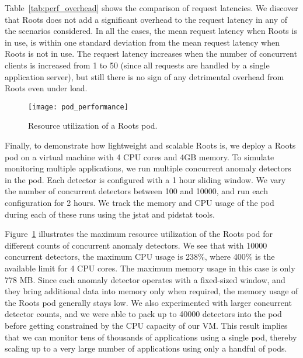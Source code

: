 Table~\ref{tab:perf_overhead} shows the comparison of request 
latencies. We discover that Roots does not add a significant overhead
to the request latency in any of the scenarios considered. In all the cases,
the mean request latency when Roots is in use, is within one standard deviation
from the mean request latency when Roots is not in use. 
The request latency increases when the number of concurrent clients is
increased from 1 to 50 (since all requests are handled by a single
application server), but still there is no sign of any detrimental overhead
from Roots even under load. 

\begin{figure}
\centering
\texttt{[image: pod\_performance]}
\caption{Resource utilization of a Roots pod.}
\label{fig:pod_performance}
\end{figure}

Finally, to demonstrate how lightweight and scalable Roots is, we deploy
a Roots pod on a virtual machine with 4 CPU cores and 4GB memory.
To simulate monitoring multiple applications, we run multiple concurrent anomaly
detectors in the pod. Each detector is configured with a 1 hour sliding window.
We vary the number of concurrent
detectors between 100 and 10000, and run each configuration for
2 hours. We track the memory and CPU usage of the
pod during each of these runs using the jstat and pidstat tools. 

Figure~\ref{fig:pod_performance}
illustrates the maximum resource utilization of the Roots pod for different counts of
concurrent anomaly detectors. We see that with 10000 concurrent
detectors, the maximum CPU usage is 238\%, where 400\% is the available limit
for 4 CPU cores. The maximum memory usage in this case is only 778 MB. 
Since each anomaly detector operates with a fixed-sized window, and they
bring additional data into memory only when required, the memory
usage of the Roots pod generally stays low. 
We also experimented with larger concurrent
detector counts, and we were able to pack up to 40000 detectors into the pod before
getting constrained by the CPU capacity of our VM.
This result implies that we can monitor tens of thousands 
of applications using a single pod, thereby scaling up to a very large number
of applications using only a handful of pods.
